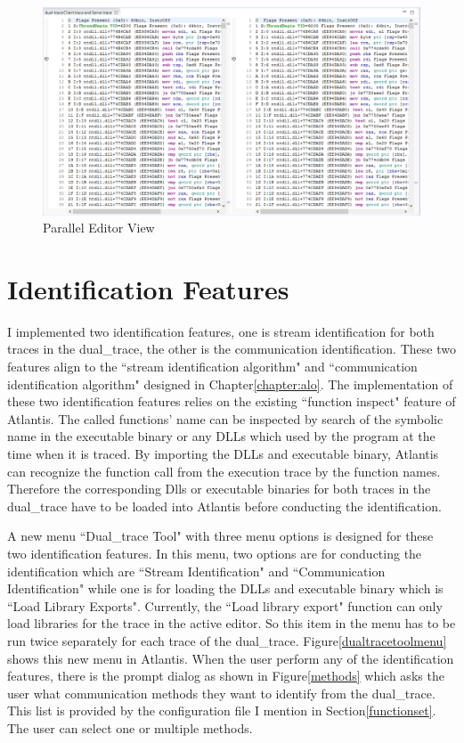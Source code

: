 \begin{figure}[H]
\centerline{\includegraphics[scale=0.6]{Figures/paralleleditor}}
 \caption{Parallel Editor View}
\label{paralleleditor}
\end{figure}



\section{Identification Features}
I implemented two identification features, one is stream identification for both traces in the dual\_trace, the other is the communication identification. These two features align to the ``stream identification algorithm" and ``communication identification algorithm" designed in Chapter\ref{chapter:alo}. The implementation of these two identification features relies on the existing ``function inspect" feature of Atlantis. The called functions' name can be inspected  by  search of the symbolic name in the executable binary or any DLLs which used by the program at the time when it is traced. By importing the DLLs and executable binary, Atlantis can recognize the function call from the execution trace by the function names. Therefore the corresponding Dlls or executable binaries for both traces in the dual\_trace have to be loaded into Atlantis before conducting the identification.

A new menu ``Dual\_trace Tool" with three menu options is designed for these two identification features. In this menu, two options are for conducting the identification which are ``Stream Identification" and ``Communication Identification" while one is for loading the DLLs and executable binary which is ``Load Library Exports". Currently, the ``Load library export" function can only load libraries for the trace in the active editor. So this item in the menu has to be run twice separately for each trace of the dual\_trace.  Figure\ref{dualtracetoolmenu} shows this new menu in Atlantis. When the user perform any of the identification features, there is the prompt dialog as shown in Figure\ref{methods} which asks the user what communication methods they want to identify from the dual\_trace. This list is provided by the configuration file I mention in Section\ref{functionset}. The user can select one or multiple methods. 

